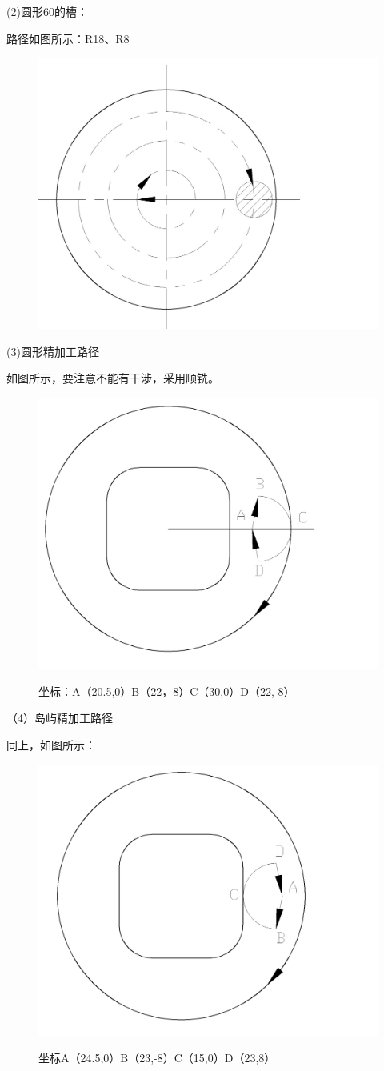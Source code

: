 (2)圆形\diameter 60的槽：

路径如图所示：R18、R8

\begin{figure}[h]
    \centering
    \includegraphics[width=0.6\linewidth,trim=0 0 130  0,clip]{data/image/19-3.jpg}
    \caption{}
    \label{fig:19-3}
\end{figure}

(3)圆形精加工路径

如图所示，要注意不能有干涉，采用顺铣。

\begin{figure}[h]
    \centering
    \includegraphics[width=0.6\linewidth,trim=0 0 130  0,clip]{data/image/19-4.jpg}
    \caption{}
    \label{fig:19-4}
    坐标：A（20.5,0）B（22，8）C（30,0）D（22,-8）
\end{figure}


（4）岛屿精加工路径

同上，如图所示：
\begin{figure}[h]
    \centering
    \includegraphics[width=0.6\linewidth,trim=0 0 130  0,clip]{data/image/19-5.jpg}
    \caption{}
    \label{fig:19-5}
    坐标A（24.5,0）B（23,-8）C（15,0）D（23,8）
\end{figure}



